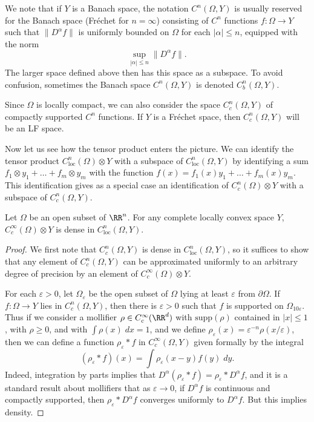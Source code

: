 \begin{remark}
    We note that if $Y$ is a Banach space, the notation $C^n(\Omega,Y)$ is usually reserved for the Banach space (Fr\'{e}chet for $n = \infty$) consisting of $C^n$ functions $f: \Omega \to Y$ such that $\| D^\alpha f \|$ is uniformly bounded on $\Omega$ for each $|\alpha| \leq n$, equipped with the norm
    \[ \sup_{|\alpha| \leq n} \| D^\alpha f \|. \]
    The larger space defined above then has this space as a subspace. To avoid confusion, sometimes the Banach space $C^n(\Omega,Y)$ is denoted $C^n_b(\Omega,Y)$.
\end{remark}

Since $\Omega$ is locally compact, we can also consider the space $C^n_c(\Omega,Y)$ of compactly supported $C^n$ functions. If $Y$ is a Fr\'{e}chet space, then $C^n_c(\Omega,Y)$ will be an LF space.

Now let us see how the tensor product enters the picture. We can identify the tensor product $C^n_{\text{loc}}(\Omega) \otimes Y$ with a subspace of $C^n_{\text{loc}}(\Omega,Y)$ by identifying a sum $f_1 \otimes y_1 + \dots + f_m \otimes y_m$ with the function $f(x) = f_1(x) y_1 + \dots + f_m(x) y_m$. This identification gives as a special case an identification of $C^n_c(\Omega) \otimes Y$ with a subspace of $C^n_c(\Omega,Y)$.

\begin{lemma}
    Let $\Omega$ be an open subset of $\RR^n$. For any complete locally convex space $Y$, $C_c^\infty(\Omega) \otimes Y$ is dense in $C^n_{\text{loc}}(\Omega,Y)$.
\end{lemma}
\begin{proof}
    We first note that $C_c^n(\Omega,Y)$ is dense in $C^n_{\text{loc}}(\Omega,Y)$, so it suffices to show that any element of $C_c^n(\Omega,Y)$ can be approximated uniformly to an arbitrary degree of precision by an element of $C_c^\infty(\Omega) \otimes Y$.

    For each $\varepsilon > 0$, let $\Omega_\varepsilon$ be the open subset of $\Omega$ lying at least $\varepsilon$ from $\partial \Omega$. If $f: \Omega \to Y$ lies in $C_c^n(\Omega,Y)$, then there is $\varepsilon > 0$ such that $f$ is supported on $\Omega_{10 \varepsilon}$. Thus if we consider a mollifier $\rho \in C_c^\infty(\RR^d)$ with $\text{supp}(\rho)$ contained in $|x| \leq 1$, with $\rho \geq 0$, and with $\int \rho(x)\; dx = 1$, and we define $\rho_\varepsilon(x) = \varepsilon^{-n} \rho(x / \varepsilon)$, then we can define a function $\rho_\varepsilon * f$ in $C_c^\infty(\Omega,Y)$ given formally by the integral
    \[ (\rho_\varepsilon * f)(x) = \int \rho_\varepsilon(x - y) f(y)\; dy. \]
    Indeed, integration by parts implies that $D^\alpha (\rho_\varepsilon * f) = \rho_\varepsilon * D^\alpha f$, and it is a standard result about mollifiers that as $\varepsilon \to 0$, if $D^\alpha f$ is continuous and compactly supported, then $\rho_\varepsilon * D^\alpha f$ converges uniformly to $D^\alpha f$. But this implies density.
\end{proof}

